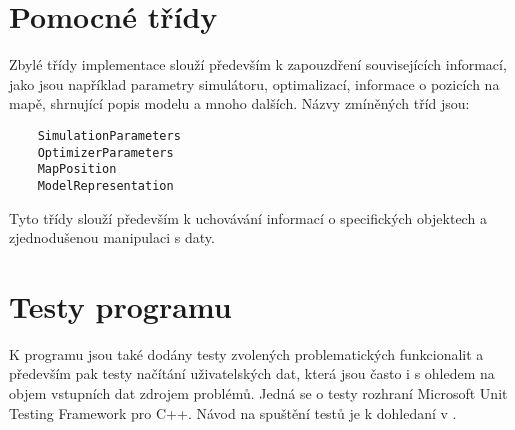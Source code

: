 \section{Pomocné třídy}

Zbylé třídy implementace slouží především k zapouzdření souvisejících informací,
jako jsou například parametry simulátoru, optimalizací, informace o pozicích na mapě, 
shrnující popis modelu a mnoho dalších. Názvy zmíněných tříd jsou:

\begin{verbatim}
    SimulationParameters
    OptimizerParameters
    MapPosition
    ModelRepresentation
\end{verbatim}

Tyto třídy slouží především k uchovávání informací o specifických objektech a
zjednodušenou manipulaci s daty.


\section{Testy programu}

K programu jsou také dodány testy zvolených problematických funkcionalit a
především pak testy načítání uživatelských dat, která jsou často i s ohledem na 
objem vstupních dat zdrojem problémů. Jedná se o testy rozhraní Microsoft Unit
Testing Framework pro C++. Návod na spuštění testů je k dohledaní v \citep{corob-msft_2022}.